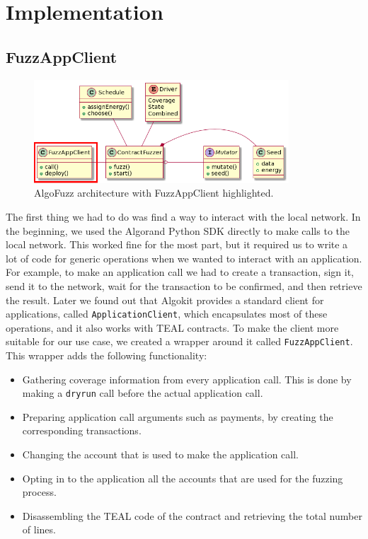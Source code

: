 \section{Implementation} \label{section:implementation}

\subsection*{FuzzAppClient}

\begin{figure}[htbp]
    \centering
    \includegraphics[width=0.85\textwidth]{figures/arc-client.png}
    \caption{AlgoFuzz architecture with FuzzAppClient highlighted.}\label{fig:architecture-client}
\end{figure}

The first thing we had to do was find a way to interact with the local network.
In the beginning, we used the Algorand Python \ac{SDK} \cite{noauthor_algorand_nodate-5} directly to make calls to the local network.
This worked fine for the most part, but it required us to write a lot of code for generic operations when we wanted to interact with an application.
For example, to make an application call we had to create a transaction, sign it, send it to the network, wait for the transaction to be confirmed, and then retrieve the result.
Later we found out that Algokit provides a standard client for applications, called \texttt{ApplicationClient}, which encapsulates most of these operations, and it also works with \ac{TEAL} contracts.
To make the client more suitable for our use case, we created a wrapper around it called \texttt{FuzzAppClient}.
This wrapper adds the following functionality:
\begin{itemize}
    \item Gathering coverage information from every application call. This is done by making a \texttt{dryrun} call before the actual application call.
    \item Preparing application call arguments such as payments, by creating the corresponding transactions.
    \item Changing the account that is used to make the application call.
    \item Opting in to the application all the accounts that are used for the fuzzing process.
    \item Disassembling the \ac{TEAL} code of the contract and retrieving the total number of lines.
\end{itemize}


